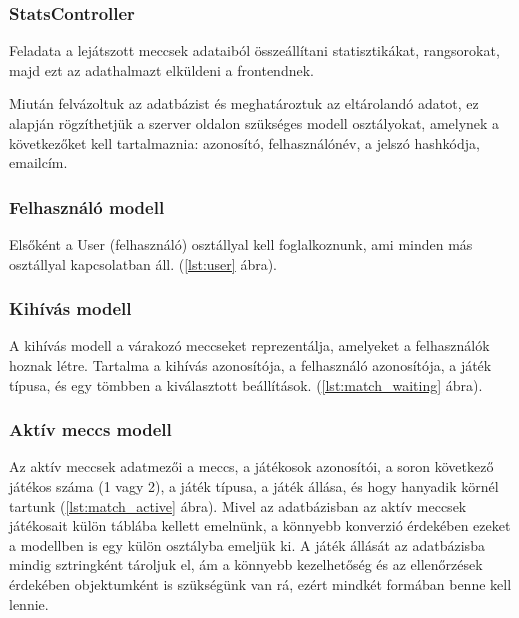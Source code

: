 \subsubsection{StatsController}
Feladata a lejátszott meccsek adataiból összeállítani statisztikákat, rangsorokat, majd ezt az adathalmazt elküldeni a frontendnek.




Miután felvázoltuk az adatbázist és meghatároztuk az eltárolandó adatot, ez alapján rögzíthetjük a szerver oldalon szükséges modell osztályokat, amelynek a következőket kell tartalmaznia: azonosító, felhasználónév, a jelszó hashkódja, emailcím.


\subsubsection{Felhasználó modell}
Elsőként a User (felhasználó) osztállyal kell foglalkoznunk, ami minden más osztállyal kapcsolatban áll. (\ref{lst:user} ábra).



\subsubsection{Kihívás modell}
A kihívás modell a várakozó meccseket reprezentálja, amelyeket a felhasználók hoznak létre. Tartalma a kihívás azonosítója, a felhasználó azonosítója, a játék típusa, és egy tömbben a kiválasztott beállítások. (\ref{lst:match_waiting} ábra).



\subsubsection{Aktív meccs modell}
Az aktív meccsek adatmezői a meccs, a játékosok azonosítói, a soron következő játékos száma (1 vagy 2), a játék típusa, a játék állása, és hogy hanyadik körnél tartunk (\ref{lst:match_active} ábra). Mivel az adatbázisban az aktív meccsek játékosait külön táblába kellett emelnünk, a könnyebb konverzió érdekében ezeket a modellben is egy külön osztályba emeljük ki. A játék állását az adatbázisba mindig sztringként tároljuk el, ám a könnyebb kezelhetőség és az ellenőrzések érdekében objektumként is szükségünk van rá, ezért mindkét formában benne kell lennie.

